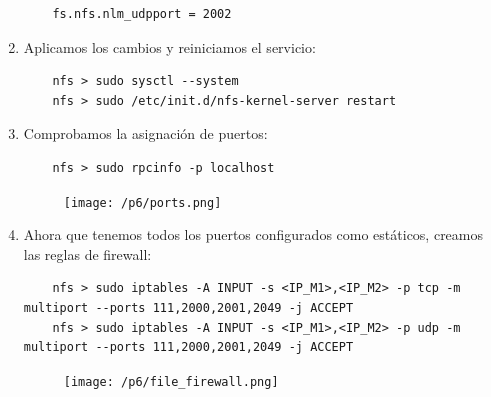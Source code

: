 \documentclass[12pt,spanish]{article}
\begin{document}
\begin{enumerate}
\begin{lstlisting}
	fs.nfs.nlm_udpport = 2002
	\end{lstlisting}
	\item Aplicamos los cambios y reiniciamos el servicio:
	\begin{lstlisting}
	nfs > sudo sysctl --system
	nfs > sudo /etc/init.d/nfs-kernel-server restart
	\end{lstlisting}
	\item Comprobamos la asignación de puertos:
	\begin{lstlisting}
	nfs > sudo rpcinfo -p localhost
	\end{lstlisting}
	\begin{figure}[H]
		\centering
		\texttt{[image: /p6/ports.png]}
	\end{figure}
	\item Ahora que tenemos todos los puertos configurados como estáticos, creamos las reglas de firewall:
	\begin{lstlisting}
	nfs > sudo iptables -A INPUT -s <IP_M1>,<IP_M2> -p tcp -m multiport --ports 111,2000,2001,2049 -j ACCEPT
	nfs > sudo iptables -A INPUT -s <IP_M1>,<IP_M2> -p udp -m multiport --ports 111,2000,2001,2049 -j ACCEPT
	\end{lstlisting}
	\begin{figure}[H]
		\centering
		\texttt{[image: /p6/file\_firewall.png]}
	\end{figure}
\end{enumerate}
\end{document}
